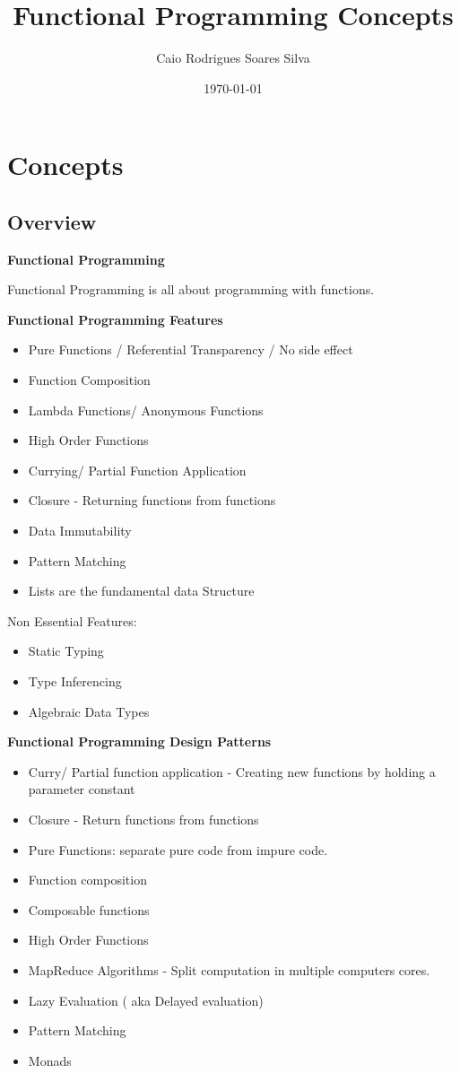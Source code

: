 \documentclass[11pt]{article}
\author{Caio Rodrigues Soares Silva}
\date{\today}
\title{Functional Programming Concepts}
\begin{document}
\maketitle
\tableofcontents


\section{Concepts}
\label{sec-1}
\subsection{Overview}
\label{sec-1-1}

\textbf{Functional Programming}

Functional Programming is all about programming with functions.

\textbf{Functional Programming Features}

\begin{itemize}
\item Pure Functions / Referential Transparency / No side effect
\item Function Composition
\item Lambda Functions/ Anonymous Functions
\item High Order Functions
\item Currying/ Partial Function Application
\item Closure - Returning functions from functions
\item Data Immutability
\item Pattern Matching
\item Lists are the fundamental data Structure
\end{itemize}

Non Essential Features:

\begin{itemize}
\item Static Typing
\item Type Inferencing
\item Algebraic Data Types
\end{itemize}

\textbf{Functional Programming Design Patterns}

\begin{itemize}
\item Curry/ Partial function application  - Creating new functions by holding a parameter constant
\item Closure - Return functions from functions
\item Pure Functions: separate pure code from impure code.
\item Function composition
\item Composable functions
\item High Order Functions
\item MapReduce Algorithms - Split computation in multiple computers cores.
\item Lazy Evaluation ( aka Delayed evaluation)
\item Pattern Matching
\item Monads
\end{itemize}
\end{document}

